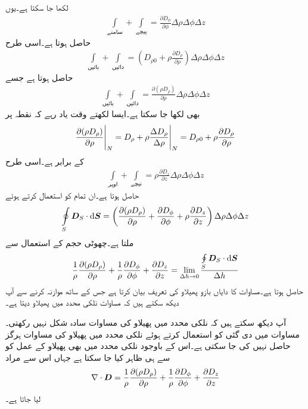 لکھا جا سکتا ہے۔یوں
\begin{align*}
\int \limits_{\textrm{سامنے}}+\int\limits_{\textrm{پیچے}}=\frac{\partial D_{\phi}}{\partial \phi} \Delta \rho \Delta \phi \Delta z
\end{align*}
حاصل ہوتا ہے۔اسی طرح
\begin{align*}
\int \limits_{\textrm{بائیں}}+\int \limits_{\textrm{دائیں}}=\left(D_{\rho 0} +\rho \frac{\partial D_{\rho}}{\partial \rho} \right) \Delta \rho \Delta \phi \Delta z
\end{align*}
حاصل ہوتا ہے جسے
\begin{align*}
\int \limits_{\textrm{بائیں}}+\int \limits_{\textrm{دائیں}}=\frac{\partial (\rho D_{\rho})}{\partial \rho}  \Delta \rho \Delta \phi \Delta z
\end{align*}
بھی لکھا جا سکتا ہے۔ایسا لکھتے وقت یاد رہے کہ نقطہ  پر
\begin{align*}
\eval{\frac{\partial (\rho D_{\rho})}{\partial \rho}}_{N}=\eval{D_{\rho}+\rho \frac{\Delta D_{\rho}}{\Delta \rho}}_{N}=D_{\rho 0} +\rho \frac{\partial D_{\rho}}{\partial \rho}
\end{align*}
کے برابر ہے۔اسی طرح
\begin{align*}
\int \limits_{\textrm{اوپر}}+\int\limits_{\textrm{نیچے}}=\rho \frac{\partial D_{z}}{\partial z} \Delta \rho \Delta \phi \Delta z
\end{align*}
حاصل ہوتا ہے۔ان تمام کو استعمال کرتے ہوئے
\begin{align*}
\oint\limits_{S} \kvec{D}_S \cdot \dif \kvec{S}=\left(\frac{\partial (\rho D_{\rho})}{\partial \rho}+\frac{\partial D_{\phi}}{\partial \phi}  + \rho \frac{\partial D_{z}}{\partial z}   \right)\Delta \rho \Delta \phi \Delta z
\end{align*}
ملتا ہے۔چھوٹی حجم  کے استعمال سے
\begin{align}\label{مساوات_گاؤس_نلکی_پھیلاو_کی_تعریف}
\frac{1}{\rho}\frac{\partial (\rho D_{\rho})}{\partial \rho}+\frac{1}{\rho}\frac{\partial D_{\phi}}{\partial \phi}  +  \frac{\partial D_{z}}{\partial z}=\lim_{\Delta h \to 0} \frac{\oint\limits_{S} \kvec{D}_S \cdot \dif \kvec{S}}{\Delta h}
\end{align}
حاصل ہوتا ہے۔مساوات  کا دایاں بازو پھیلاو کی تعریف بیان کرتا ہے جس کے ساتھ موازنہ کرنے سے آپ دیکھ سکتے ہیں کہ مساوات  نلکی محدد میں پھیلاو  دیتا ہے۔

آپ دیکھ سکتے ہیں کہ نلکی محدد میں پھیلاو کی مساوات سادہ شکل نہیں رکھتی۔مساوات  میں دی گئی  کو استعمال کرتے ہوئے نلکی محدد میں پھیلاو کی مساوات ہرگز حاصل نہیں کی جا سکتی ہے۔اس کے باوجود نلکی محدد میں بھی پھیلاو کے عمل کو  سے ہی ظاہر کیا جا سکتا ہے جہاں اس سے مراد
\begin{align}
\nabla \cdot {\ensuremath{{\boldsymbol{D}}}}=\frac{1}{\rho}\frac{\partial (\rho D_{\rho})}{\partial \rho}+\frac{1}{\rho}\frac{\partial D_{\phi}}{\partial \phi}  +  \frac{\partial D_{z}}{\partial z}
\end{align}
لیا جاتا ہے۔
 

